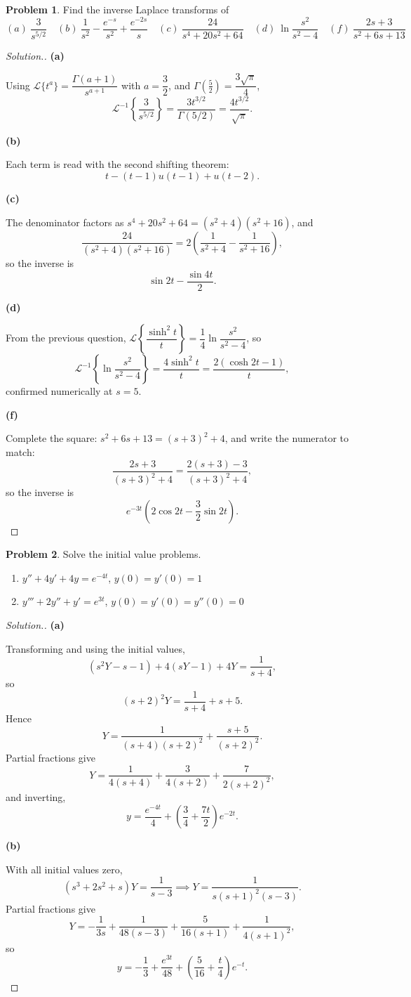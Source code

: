 \documentclass[11pt,a4paper]{article}
\theoremstyle{definition}
\newtheorem{problemx}{Problem}[subsection]
\newenvironment{problem}{\begin{problemx}}{\end{problemx}}
\newenvironment{solution}
  {\renewcommand{\qedsymbol}{}\begin{proof}[\textit{Solution}.]}
  {\end{proof}}
\newcommand{\subhead}[1]{%
  \par\medskip\noindent\textbf{#1}\par\nobreak\smallskip}
\begin{document}
\begin{problem}
Find the inverse Laplace transforms of
\[(a)\ \frac{3}{s^{5/2}}\quad 
(b)\ \frac{1}{s^2}-\frac{e^{-s}}{s^2}+\frac{e^{-2s}}{s}\quad 
(c)\ \frac{24}{s^4+20s^2+64}\quad 
(d)\ \ln\frac{s^2}{s^2-4}\quad 
(f)\ \frac{2s+3}{s^2+6s+13}\]
\end{problem}
\begin{solution}
\subhead{(a)}
Using $\mathcal{L}\{t^a\} = \dfrac{\Gamma(a+1)}{s^{a+1}}$ with
$a = \dfrac32$, and $\Gamma(\tfrac52) = \dfrac{3\sqrt\pi}{4}$,
\[\mathcal{L}^{-1}\left\{\frac{3}{s^{5/2}}\right\}
= \frac{3t^{3/2}}{\Gamma(5/2)} = \frac{4t^{3/2}}{\sqrt\pi}.\]

\subhead{(b)}
Each term is read with the second shifting theorem:
\[t - (t-1)u(t-1) + u(t-2).\]

\subhead{(c)}
The denominator factors as
$s^4+20s^2+64 = (s^2+4)(s^2+16)$, and
\[\frac{24}{(s^2+4)(s^2+16)}
= 2\left(\frac{1}{s^2+4} - \frac{1}{s^2+16}\right),\]
so the inverse is
\[\sin 2t - \frac{\sin 4t}{2}.\]

\subhead{(d)}
From the previous question,
$\mathcal{L}\left\{\dfrac{\sinh^2t}{t}\right\} = \dfrac14\ln\dfrac{s^2}{s^2-4}$,
so
\[\mathcal{L}^{-1}\left\{\ln\frac{s^2}{s^2-4}\right\}
= \frac{4\sinh^2t}{t} = \frac{2(\cosh 2t-1)}{t},\]
confirmed numerically at $s=5$.

\subhead{(f)}
Complete the square: $s^2+6s+13 = (s+3)^2+4$, and write the numerator to match:
\[\frac{2s+3}{(s+3)^2+4} = \frac{2(s+3)-3}{(s+3)^2+4},\]
so the inverse is
\[e^{-3t}\left(2\cos 2t - \frac32\sin 2t\right).\]
\end{solution}

\begin{problem}
Solve the initial value problems.
\begin{enumerate}
\item[(a)] $y''+4y'+4y = e^{-4t}$, $y(0)=y'(0)=1$
\item[(b)] $y'''+2y''+y' = e^{3t}$, $y(0)=y'(0)=y''(0)=0$
\end{enumerate}
\end{problem}
\begin{solution}
\subhead{(a)}
Transforming and using the initial values,
\[(s^2Y-s-1) + 4(sY-1) + 4Y = \frac{1}{s+4},\]
so
\[(s+2)^2Y = \frac{1}{s+4} + s + 5 .\]
Hence
\[Y = \frac{1}{(s+4)(s+2)^2} + \frac{s+5}{(s+2)^2}.\]
Partial fractions give
\[Y = \frac{1}{4(s+4)} + \frac{3}{4(s+2)} + \frac{7}{2(s+2)^2},\]
and inverting,
\[y = \frac{e^{-4t}}{4} + \left(\frac34 + \frac{7t}{2}\right)e^{-2t}.\]

\subhead{(b)}
With all initial values zero,
\[(s^3+2s^2+s)Y = \frac{1}{s-3}
\implies Y = \frac{1}{s(s+1)^2(s-3)}.\]
Partial fractions give
\[Y = -\frac{1}{3s} + \frac{1}{48(s-3)} + \frac{5}{16(s+1)} + \frac{1}{4(s+1)^2},\]
so
\[y = -\frac13 + \frac{e^{3t}}{48} + \left(\frac{5}{16} + \frac{t}{4}\right)e^{-t}.\]
\end{solution}
\end{document}
